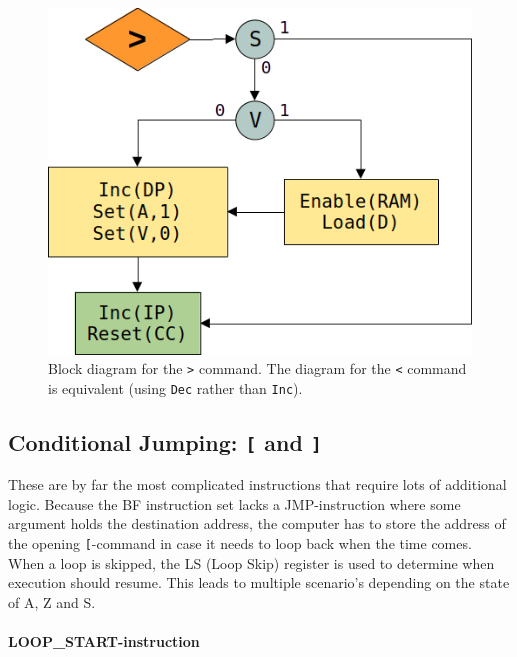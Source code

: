 \begin{figure}[h]
  \centering
  \includegraphics[scale=0.3]{img/rightalg}
  \caption{Block diagram for the \texttt{>} command. The diagram for the \texttt{<} command is equivalent (using \texttt{Dec} rather than \texttt{Inc}).}
  \label{fig:rightalg}
\end{figure}

\subsection{Conditional Jumping: \texttt{[} and \texttt{]}}
These are by far the most complicated instructions that require lots of additional logic. Because the BF instruction set lacks a JMP-instruction where some argument holds the destination address, the computer has to store the address of the opening \texttt{[}-command in case it needs to loop back when the time comes. When a loop is skipped, the LS (Loop Skip) register is used to determine when execution should resume. This leads to multiple scenario's depending on the state of A, Z and S.
  
  \paragraph{LOOP\_START-instruction} 


